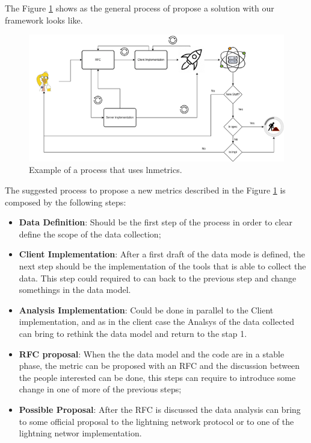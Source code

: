 The Figure \ref{fig:lnmetrics_process} shows as the general process of propose 
a solution with our framework looks like.

\begin{figure}
    \begin{center}
      \includegraphics[scale=0.7]{imgs/lnmetrics-workflow-drawio.png}
    \end{center}
    \caption{Example of a process that uses lnmetrics.}
    \label{fig:lnmetrics_process}
\end{figure}

The suggested process to propose a new metrics described in the Figure \ref{fig:lnmetrics_process}
is composed by the following steps:

\begin{itemize}
    \item {\bf Data Definition}: Should be the first step of the process in order
        to clear define the scope of the data collection;
    \item {\bf Client Implementation}: After a first draft of the data mode is defined,
        the next step should be the implementation of the tools that is able to collect 
        the data. This step could required to can back to the previous step and change 
        somethings in the data model.
    \item {\bf Analysis Implementation}: Could be done in parallel to the Client implementation,
        and as in the client case the Analsys of the data collected can bring to rethink the data model
        and return to the stap 1.
    \item {\bf RFC proposal}: When the the data model and the code are in a stable phase,
        the metric can be proposed with an RFC and the discussion between the people interested
        can be done, this steps can require to introduce some change in one of more of the previous steps;
    \item {\bf Possible Proposal}: After the RFC is discussed the data analysis can bring to some 
        official proposal to the lightning network protocol or to one of the lightning networ implementation.
\end{itemize}

